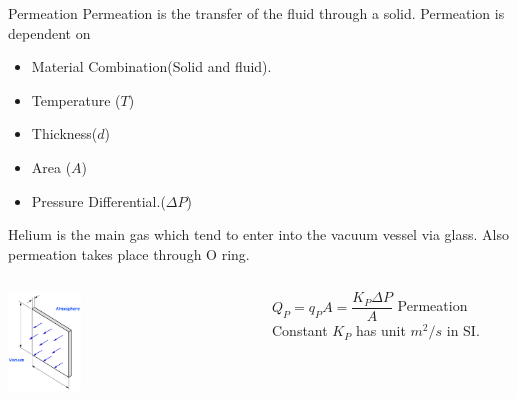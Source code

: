 \documentclass[11]{beamer}
\begin{document}
\begin{frame}{Permeation}
Permeation is the transfer of the fluid through a solid. Permeation is dependent on 
\begin{itemize}
\item Material Combination(Solid and fluid).
\item Temperature ($T$)
\item Thickness($d$)
\item Area ($A$)
\item Pressure Differential.($\Delta P$)
\end{itemize}
Helium is the main gas which tend to enter into the vacuum vessel via glass. Also permeation takes place through O ring.

 \begin{columns}[t]
    
      
       \begin{exampleblock}{}
         \begin{center}
			\includegraphics[width=0.3\textwidth]{Permeation.png}
		\end{center}
       \end{exampleblock}
       
       \begin{exampleblock}{ }
          \begin{center}
		   $Q_{P}=q_{P}A = \dfrac{K_{P}\Delta P}{A}$ \break
		   Permeation Constant $K_{P}$ has unit $ m^{2}/s $ in SI.		
		\end{center}    
       
       \end{exampleblock}   
   
    \end{columns}   
    
    
   			
  	


\end{frame}
\end{document}
